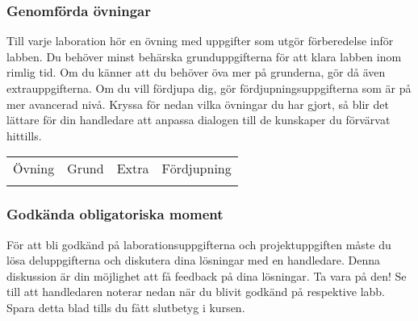 
\label{progress-protocoll} 


\subsubsection*{Genomförda övningar}

\vspace{1em}\noindent 
{Till varje laboration hör en övning med uppgifter som utgör förberedelse inför labben. Du behöver minst behärska grunduppgifterna för att klara labben inom rimlig tid. Om du känner att du behöver öva mer på grunderna, gör då även extrauppgifterna. Om du vill fördjupa dig, gör fördjupningsuppgifterna som är på mer avancerad nivå. Kryssa för nedan vilka övningar du har gjort, så blir det lättare för din handledare att anpassa dialogen till de kunskaper du förvärvat hittills.}

\newcommand{\TickBox}{\raisebox{-.50ex}{\Large$\square$}}
\newcommand{\ExeRow}[1]{\texttt{#1} & \TickBox  &  \TickBox &  \TickBox  \\ \addlinespace }

\begin{table}[h]
\centering
\vspace{2em}
\begin{tabular}{lccc}
\toprule \addlinespace 
{\sffamily\small Övning} & 
{\sffamily\small Grund} &	
{\sffamily\small Extra} &
{\sffamily\small Fördjupning}\\ \addlinespace \midrule \\[-0.7em]

\bottomrule
\end{tabular}
\end{table}

\newpage

\subsubsection*{Godkända obligatoriska moment}

\vspace{1em}\noindent 
För att bli godkänd på laborationsuppgifterna och projektuppgiften måste du lösa deluppgifterna och diskutera dina lösningar med en handledare. Denna diskussion är din möjlighet att få feedback på dina lösningar. Ta vara på den!
Se till att handledaren noterar nedan när du blivit godkänd på respektive labb. Spara detta blad tills du fått slutbetyg i kursen. 


